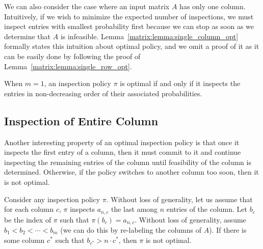 We can also consider the case where an input matrix $A$ has only one column.
 Intuitively, if we wish to minimize the expected number of inspections, we must inspect entries with smallest probability first because we can stop as soon as we determine that $A$ is infeasible.
 Lemma~\ref{matrix:lemma:single_column_opt} formally states this intuition about optimal policy, and we omit a proof of it as it can be easily done by following the proof of Lemma~\ref{matrix:lemma:single_row_opt}. 
 \begin{lemma} \label{matrix:lemma:single_column_opt}
 When $m = 1$, an inspection policy $\pi$ is optimal if and only if it inspects the entries in non-decreasing order of their associated probabilities.
 \end{lemma}


 \subsection{Inspection of Entire Column}
 Another interesting property of an optimal inspection policy is that once it inspects the first entry of a column, then it must commit to it and continue inspecting the remaining entries of the column until feasibility of the column is determined. Otherwise, if the policy switches to another column too soon, then it is not optimal. 
 \begin{theorem} \label{matrix:theorem:col_by_col_opt}
 Consider any inspection policy $\pi$.
 Without loss of generality, let us assume that for each column $c$, $\pi$ inspects $a_{n,c}$ the last among $n$ entries of the column. 
 Let $b_c$ be the index of $\pi$ such that $\pi(b_c) = a_{n,c}$. 
 Without loss of generality, assume $b_1 < b_2 < \cdots < b_m$ (we can do this by re-labeling the columns of $A$). 
 If there is some column $c^*$ such that $b_{c^*} > n\cdot c^*$, then $\pi$ is not optimal.
 \end{theorem}
